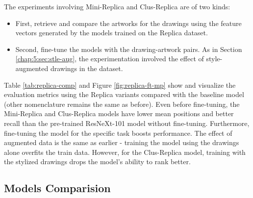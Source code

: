 The experiments involving Mini-Replica and Clus-Replica are of two kinds:
\begin{itemize}
	\item First, retrieve and compare the artworks for the drawings using the feature vectors generated by the models trained on the Replica dataset.
	\item Second, fine-tune the models with the drawing-artwork pairs. As in Section \ref{chap:5:sec:stle-aug}, the experimentation involved the effect of style-augmented drawings in the dataset.
\end{itemize}

Table \ref{tab:replica-comp} and Figure \ref{fig:replica-ft-mp} show and visualize the evaluation metrics using the Replica variants compared with the baseline model (other nomenclature remains the same as before). Even before fine-tuning, the Mini-Replica and Clus-Replica models have lower mean positions and better recall than the pre-trained ResNeXt-101 model without fine-tuning. Furthermore, fine-tuning the model for the specific task boosts performance. The effect of augmented data is the same as earlier - training the model using the drawings alone overfits the train data. However, for the Clus-Replica model, training with the stylized drawings drops the model's ability to rank better.

\subsection{Models Comparision}\label{chap:5:sec:all-models}

